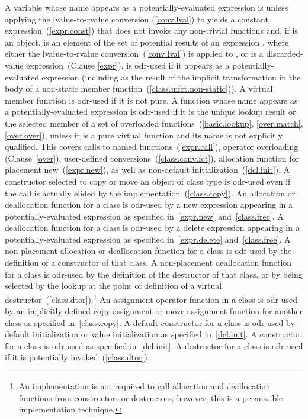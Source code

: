 \pnum
A variable  whose name appears as a
potentially-evaluated expression  is  unless
applying the lvalue-to-rvalue conversion (\ref{conv.lval}) to  yields
a constant expression~(\ref{expr.const}) that does not invoke any non-trivial
functions
and, if  is an object,  is an element of
the set of potential results of an expression , where either the lvalue-to-rvalue
conversion~(\ref{conv.lval}) is applied to , or  is
a discarded-value expression~(Clause \ref{expr}).
 is odr-used if it appears as a potentially-evaluated expression
(including as the result of the implicit transformation in the body of a non-static
member function~(\ref{class.mfct.non-static})).
A virtual member
function is odr-used if it is not pure.
A function whose name appears as a potentially-evaluated
expression is odr-used if it is the unique lookup result or the selected
member of a set of overloaded functions~(\ref{basic.lookup}, \ref{over.match}, \ref{over.over}), unless it is a pure virtual
function and its name is not explicitly qualified.
\enternote This covers calls to named
functions~(\ref{expr.call}), operator overloading (Clause~\ref{over}),
user-defined conversions~(\ref{class.conv.fct}), allocation function for
placement new~(\ref{expr.new}), as well as non-default
initialization~(\ref{dcl.init}). A constructor selected to copy or move an
object of class type is odr-used even if the
call is actually elided by the implementation~(\ref{class.copy}). \exitnote An allocation
or deallocation function for a class is odr-used by a new expression
appearing in a potentially-evaluated expression as specified
in~\ref{expr.new} and~\ref{class.free}. A deallocation function for a
class is odr-used by a delete expression appearing in a
potentially-evaluated expression as specified in~\ref{expr.delete}
and~\ref{class.free}. A non-placement allocation or deallocation
function for a class is odr-used by the definition of a constructor of that
class. A non-placement deallocation function for a class is odr-used by the
definition of the destructor of that class, or by being selected by the
lookup at the point of definition of a virtual
destructor~(\ref{class.dtor}).\footnote{An implementation is not required
to call allocation and
deallocation functions from constructors or destructors; however, this
is a permissible implementation technique.}
An assignment operator function in a class is odr-used by an
implicitly-defined
copy-assignment or move-assignment function for another class as specified
in~\ref{class.copy}.
A default constructor for a class is odr-used by
default initialization or value initialization as specified
in~\ref{dcl.init}. A constructor for a class is odr-used as specified
in~\ref{dcl.init}. A destructor for a class is odr-used if it is potentially
invoked~(\ref{class.dtor}).

